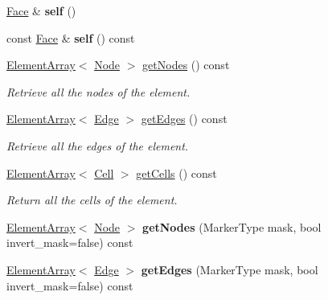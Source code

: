 \begin{DoxyCompactItemize}
\item 
\hypertarget{classINMOST_1_1Face_a9048c2c08180e0e4808a2f3f6ea1c144}{\hyperlink{classINMOST_1_1Face}{Face} \& {\bfseries self} ()}\label{classINMOST_1_1Face_a9048c2c08180e0e4808a2f3f6ea1c144}

\item 
\hypertarget{classINMOST_1_1Face_a4485c40611961b928f525a729990c65a}{const \hyperlink{classINMOST_1_1Face}{Face} \& {\bfseries self} () const }\label{classINMOST_1_1Face_a4485c40611961b928f525a729990c65a}

\item 
\hyperlink{classINMOST_1_1ElementArray}{Element\-Array}$<$ \hyperlink{classINMOST_1_1Node}{Node} $>$ \hyperlink{classINMOST_1_1Face_a102ef5504795e2b3607093071259397e}{get\-Nodes} () const 
\begin{DoxyCompactList}\small\item\em Retrieve all the nodes of the element. \end{DoxyCompactList}\item 
\hyperlink{classINMOST_1_1ElementArray}{Element\-Array}$<$ \hyperlink{classINMOST_1_1Edge}{Edge} $>$ \hyperlink{classINMOST_1_1Face_aaf5b6793bec15dec905f198b2c46c912}{get\-Edges} () const 
\begin{DoxyCompactList}\small\item\em Retrieve all the edges of the element. \end{DoxyCompactList}\item 
\hyperlink{classINMOST_1_1ElementArray}{Element\-Array}$<$ \hyperlink{classINMOST_1_1Cell}{Cell} $>$ \hyperlink{classINMOST_1_1Face_a4c1a9d6300f0b8da3032753380a1846c}{get\-Cells} () const 
\begin{DoxyCompactList}\small\item\em Return all the cells of the element. \end{DoxyCompactList}\item 
\hypertarget{classINMOST_1_1Face_adfac7ba1a6dd2db5b2ef8fedee9663ed}{\hyperlink{classINMOST_1_1ElementArray}{Element\-Array}$<$ \hyperlink{classINMOST_1_1Node}{Node} $>$ {\bfseries get\-Nodes} (Marker\-Type mask, bool invert\-\_\-mask=false) const }\label{classINMOST_1_1Face_adfac7ba1a6dd2db5b2ef8fedee9663ed}

\item 
\hypertarget{classINMOST_1_1Face_ac8f705c1ac68aee4b2406123df50120a}{\hyperlink{classINMOST_1_1ElementArray}{Element\-Array}$<$ \hyperlink{classINMOST_1_1Edge}{Edge} $>$ {\bfseries get\-Edges} (Marker\-Type mask, bool invert\-\_\-mask=false) const }\label{classINMOST_1_1Face_ac8f705c1ac68aee4b2406123df50120a}


\end{DoxyCompactItemize}
